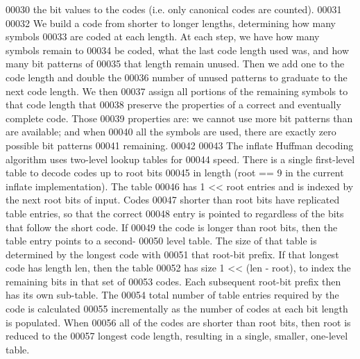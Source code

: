 \begin{DoxyCode}
00030 \textcolor{comment}{   the bit values to the codes (i.e. only canonical codes are counted).}
00031 \textcolor{comment}{}
00032 \textcolor{comment}{   We build a code from shorter to longer lengths, determining how many symbols}
00033 \textcolor{comment}{   are coded at each length.  At each step, we have how many symbols remain to}
00034 \textcolor{comment}{   be coded, what the last code length used was, and how many bit patterns of}
00035 \textcolor{comment}{   that length remain unused. Then we add one to the code length and double the}
00036 \textcolor{comment}{   number of unused patterns to graduate to the next code length.  We then}
00037 \textcolor{comment}{   assign all portions of the remaining symbols to that code length that}
00038 \textcolor{comment}{   preserve the properties of a correct and eventually complete code.  Those}
00039 \textcolor{comment}{   properties are: we cannot use more bit patterns than are available; and when}
00040 \textcolor{comment}{   all the symbols are used, there are exactly zero possible bit patterns}
00041 \textcolor{comment}{   remaining.}
00042 \textcolor{comment}{}
00043 \textcolor{comment}{   The inflate Huffman decoding algorithm uses two-level lookup tables for}
00044 \textcolor{comment}{   speed.  There is a single first-level table to decode codes up to root bits}
00045 \textcolor{comment}{   in length (root == 9 in the current inflate implementation).  The table}
00046 \textcolor{comment}{   has 1 << root entries and is indexed by the next root bits of input.  Codes}
00047 \textcolor{comment}{   shorter than root bits have replicated table entries, so that the correct}
00048 \textcolor{comment}{   entry is pointed to regardless of the bits that follow the short code.  If}
00049 \textcolor{comment}{   the code is longer than root bits, then the table entry points to a second-}
00050 \textcolor{comment}{   level table.  The size of that table is determined by the longest code with}
00051 \textcolor{comment}{   that root-bit prefix.  If that longest code has length len, then the table}
00052 \textcolor{comment}{   has size 1 << (len - root), to index the remaining bits in that set of}
00053 \textcolor{comment}{   codes.  Each subsequent root-bit prefix then has its own sub-table.  The}
00054 \textcolor{comment}{   total number of table entries required by the code is calculated}
00055 \textcolor{comment}{   incrementally as the number of codes at each bit length is populated.  When}
00056 \textcolor{comment}{   all of the codes are shorter than root bits, then root is reduced to the}
00057 \textcolor{comment}{   longest code length, resulting in a single, smaller, one-level table.}

\end{DoxyCode}
